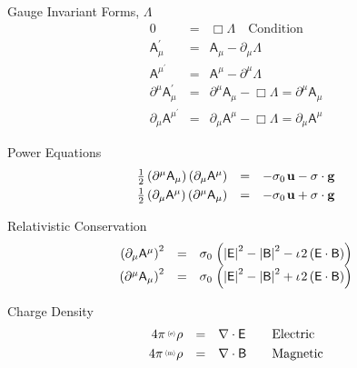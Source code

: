 \documentclass[aps,twocolumn,secnumarabic,nobalancelastpage,amsmath,amssymb,
amsthm,nofootinbib,parskip=full]{revtex4}
\numberwithin{equation}{section}
\newcommand{\abs}[1]{\left|#1\right|}
\newcommand{\iu}{\iota\mkern1mu}
\newcommand{\pauli}[1]{\sigma_#1\mkern2mu}
\newcommand{\qv}[1]{\mathbf{\mathsf{#1}}}
\newcommand{\ppv}[2]{{\,\raisebox{2pt}{\scalebox{.5}{(#1)\,}}}#2}
\newcommand{\ssl}[2]{\ppv{#1}{#2}}
\begin{document}
Gauge Invariant Forms, $\Lambda$
\begin{equation*}
\begin{array}{rcl}
  0&=&\Box\Lambda\quad\text{Condition} \\[3pt]
  \qv{A}_\mu^\prime&=&\qv{A}_\mu-\partial_\mu\Lambda \\[3pt]
  \qv{A}^\mu^\prime&=&\qv{A}^\mu-\partial^\mu\Lambda \\[3pt]
  \partial^\mu\qv{A}_\mu^\prime&=&\partial^\mu\qv{A}_\mu-\Box\Lambda
        =\partial^\mu\qv{A}_\mu\\[3pt]
  \partial_\mu\qv{A}^\mu^\prime&=&\partial_\mu\qv{A}^\mu-\Box\Lambda
        =\partial_\mu\qv{A}^\mu
\end{array}
\end{equation*}

Power Equations
\begin{equation*}
\begin{array}{rcl}
\frac{1}{2}\left(\partial^\mu\qv{A}_\mu\right)
  \left(\partial_\mu\qv{A}^\mu\right)&=&
              -\pauli{0}\mathbf{u}-\sigma\cdot\mathbf{g} \\[3pt]
\frac{1}{2}\left(\partial_\mu\qv{A}^\mu\right)
  \left(\partial^\mu\qv{A}_\mu\right)&=&
              -\pauli{0}\mathbf{u}+\sigma\cdot\mathbf{g}
\end{array}
\end{equation*}

Relativistic Conservation
\begin{equation*}
\begin{array}{rcl}
\left(\partial_\mu\qv{A}^\mu\right)^2&=&
                  \pauli{0}\left(\abs{\qv{E}}^2-\abs{\qv{B}}^2
                -\iu 2\left(\qv{E}\cdot\qv{B}\right)\right) \\[3pt]
\left(\partial^\mu\qv{A}_\mu\right)^2&=&
                  \pauli{0}\left(\abs{\qv{E}}^2-\abs{\qv{B}}^2
                 +\iu 2\left(\qv{E}\cdot\qv{B}\right)\right) \\[3pt]
\end{array}
\end{equation*}

Charge Density
\begin{equation*}
\begin{array}{rclll}
4\pi\ssl{e}{\rho}&=&\nabla\cdot\qv{E}&&\text{Electric} \\[3pt]
4\pi\ssl{m}{\rho}&=&\nabla\cdot\qv{B}&&\text{Magnetic}
\end{array}
\end{equation*}
\end{document}
